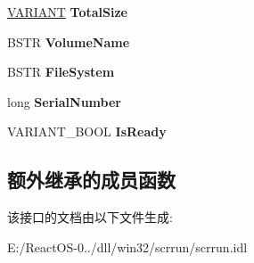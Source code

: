 \begin{DoxyCompactItemize}
\item 
\mbox{\label{interface_scripting_1_1_i_drive_aedabd4a9be49210cf6347d39600af0f5}} 
\hyperlink{structtag_v_a_r_i_a_n_t}{V\+A\+R\+I\+A\+NT} {\bfseries Total\+Size}
\item 
\mbox{\label{interface_scripting_1_1_i_drive_a5b274b7589f64fe1d029557aaee99e45}} 
B\+S\+TR {\bfseries Volume\+Name}
\item 
\mbox{\label{interface_scripting_1_1_i_drive_a0669e657cf778a8afc2f9f62245875d5}} 
B\+S\+TR {\bfseries File\+System}
\item 
\mbox{\label{interface_scripting_1_1_i_drive_a843d13fed546453f99af10172d3e71da}} 
long {\bfseries Serial\+Number}
\item 
\mbox{\label{interface_scripting_1_1_i_drive_a32fb5e87f77c4311417680ba87d98b52}} 
V\+A\+R\+I\+A\+N\+T\+\_\+\+B\+O\+OL {\bfseries Is\+Ready}
\end{DoxyCompactItemize}
\subsection*{额外继承的成员函数}


该接口的文档由以下文件生成\+:\begin{DoxyCompactItemize}
\item 
E\+:/\+React\+O\+S-\/0../dll/win32/scrrun/scrrun.\+idl\end{DoxyCompactItemize}
